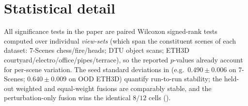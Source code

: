 \section{Statistical detail}
\label{app:perscene}

All significance tests in the paper are paired Wilcoxon signed-rank tests computed over individual
\emph{view-sets} (which span the constituent scenes of each dataset: 7-Scenes chess/fire/heads; DTU
object scans; ETH3D courtyard/electro/office/pipes/terrace), so the reported $p$-values already
account for per-scene variation. The seed standard deviations in  (e.g.\
$0.490{\pm}0.006$ on 7-Scenes; $0.640{\pm}0.009$ on OOD ETH3D) quantify run-to-run stability; the
held-out weighted and equal-weight fusions are comparably stable, and the perturbation-only fusion
wins the identical $8/12$ cells (\Cref{sec:abl-fusion}).
